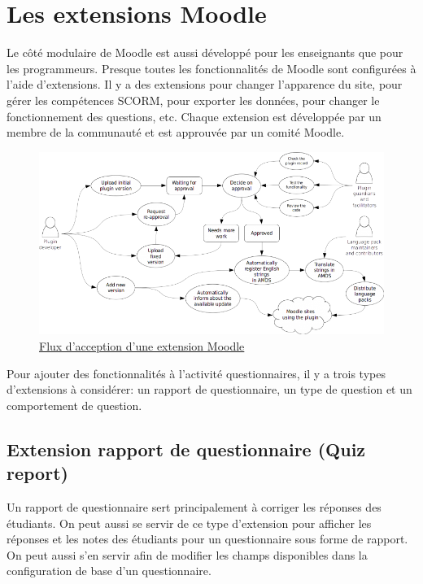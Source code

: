 \chapter{Les extensions Moodle}

Le côté modulaire de Moodle est aussi développé pour les enseignants que pour les programmeurs. Presque toutes les fonctionnalités de Moodle sont configurées à l'aide d'extensions. Il y a des extensions pour changer l'apparence du site, pour gérer les compétences SCORM, pour exporter les données, pour changer le fonctionnement des questions, etc. Chaque extension est développée par un membre de la communauté et est approuvée par un comité Moodle.

\begin{figure}[h!]
  \includegraphics[scale=0.7]{images/plugin-contribution-workflow.png}
  \caption{\href{https://docs.moodle.org/dev/Plugin_contribution}{Flux d'acception d'une extension Moodle}}
\end{figure}

Pour ajouter des fonctionnalités à l'activité questionnaires, il y a trois types d'extensions à considérer: un rapport de questionnaire, un type de question et un comportement de question.

\section{Extension rapport de questionnaire (Quiz report)}

Un rapport de questionnaire sert principalement à corriger les réponses des étudiants. On peut aussi se servir de ce type d'extension pour afficher les réponses et les notes des étudiants pour un questionnaire sous forme de rapport. On peut aussi s'en servir afin de modifier les champs disponibles dans la configuration de base d'un questionnaire.

